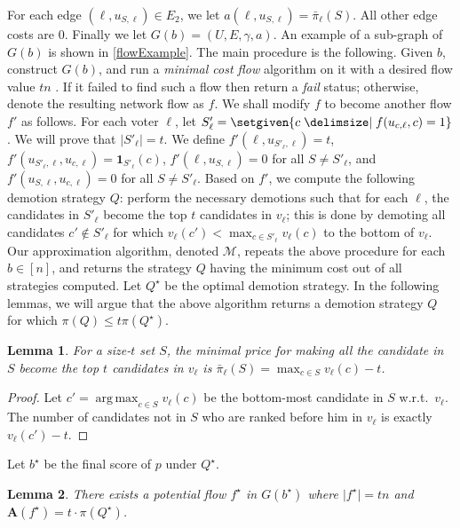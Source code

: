 \documentclass[letterpaper]{article} %
\DeclareMathOperator*{\argmax}{arg\,max}
\newtheorem{lemma}{Lemma}
\newcommand{\indic}{\mathbf{1}}
\newcommand{\vecc}{\mathbf}
\newcommand{\CMCF}{\emph{minimal cost flow}}
\newcommand{\abs}[1]{\lvert{#1}\rvert}
\newcommand{\Aoper}[1]{\vecc{A}({#1})}
\begin{document}
For each edge $(\ell, u_{S,\ell}) \in E_2$, we let $a(\ell, u_{S,\ell}) = \bar{\pi}_{\ell}(S)$. All other edge costs are $0$. Finally we let $G(b)=(U,E,\gamma,a)$. An example of a sub-graph of $G(b)$ is shown in \cref{flowExample}.
The main procedure is the following. Given $b$, construct $G(b)$, and run a \CMCF{} algorithm on it with a desired flow value $tn$ \cite{edmonds1972theoretical}. If it failed to find such a flow then return a \emph{fail} status; otherwise, denote the resulting network flow as $f$. We shall modify $f$ to become another flow $f'$ as follows.
For each voter $\ell$, let $S'_{\ell} = \setgiven{c \given f(u_{c,\ell},c)=1}$. We will prove that $\abs{S'_{\ell}}=t$. We define $f'(\ell, u_{S'_{\ell},\ell})=t$, $f'(u_{S'_{\ell},\ell}, u_{c,\ell})=\indic_{S'_{\ell}}(c)$, $f'(\ell,u_{S,\ell})=0$ for all $S \neq S'_{\ell}$, and $f'(u_{S,\ell}, u_{c,\ell})=0$ for all $S \neq S'_{\ell}$.
Based on $f'$, we compute the following demotion strategy $Q$:  perform the necessary demotions such that for each $\ell$, the candidates in $S'_{\ell}$ become the top $t$ candidates in $v_\ell$; this is done by demoting all candidates $c' \notin S'_{\ell}$ for which $v_\ell(c') < \max_{c \in S'_{\ell}} v_\ell(c)$ to the bottom of $v_\ell$.
Our approximation algorithm, denoted $\mathcal{M}$, repeats the above procedure for each $b \in [n]$, and returns the strategy $Q$ having the minimum cost out of all strategies computed.
Let $Q^{\star}$ be the optimal demotion strategy. In the following lemmas, we will argue that the above algorithm returns a demotion strategy $Q$ for which $\pi(Q) \leq t\pi(Q^{\star})$.
\begin{lemma} \label{edgesCostsLemma}
For a size-$t$ set $S$, the minimal price for making all the candidate in $S$ become the top $t$ candidates in $v_\ell$ is $\bar{\pi}_{\ell}(S)=\max_{c \in S}v_\ell(c)-t$.
\end{lemma}
\begin{proof}
Let $c' = \argmax_{c \in S}v_\ell(c)$ be the bottom-most candidate in $S$ w.r.t.\ $v_{\ell}$. The number of candidates not in $S$ who are ranked before him in $v_\ell$ is exactly $v_\ell(c')-t$.
\end{proof}
Let $b^\star$ be the final score of $p$ under  $Q^\star$.
\begin{lemma}\label{flowIsMaximal}
There exists a potential flow $f^\star$ in $G(b^\star)$ where $\abs{f^\star} = tn$ and $\Aoper{f^\star} = t\cdot \pi(Q^\star)$.
\end{lemma}
\end{document}

